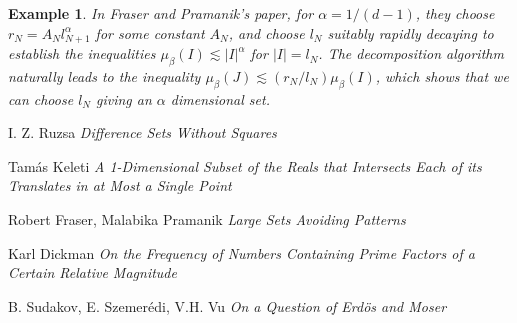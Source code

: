 \documentclass{report}
\theoremstyle{plain}
\newtheorem*{example}{Example}
\theoremstyle{plain}
\begin{document}
\begin{example}
    In Fraser and Pramanik's paper, for $\alpha = 1/(d-1)$, they choose $r_N = A_N l_{N+1}^\alpha$ for some constant $A_N$, and choose $l_N$ suitably rapidly decaying to establish the inequalities $\mu_\beta(I) \lesssim |I|^\alpha$ for $|I| = l_N$. The decomposition algorithm naturally leads to the inequality $\mu_\beta(J) \lesssim (r_N/l_N) \mu_\beta(I)$, which shows that we can choose $l_N$ giving an $\alpha$ dimensional set.
\end{example}

\begin{thebibliography}{9}

I. Z. Ruzsa
\textit{Difference Sets Without Squares}

Tam\'{a}s Keleti
\textit{A 1-Dimensional Subset of the Reals that Intersects Each of its Translates in at Most a Single Point}

Robert Fraser, Malabika Pramanik
\textit{Large Sets Avoiding Patterns}

Karl Dickman
\textit{On the Frequency of Numbers Containing Prime Factors of a Certain Relative Magnitude}

B. Sudakov, E. Szemer\'{e}di, V.H. Vu
\textit{On a Question of Erd\"{o}s and Moser}

\end{thebibliography}
\end{document}
